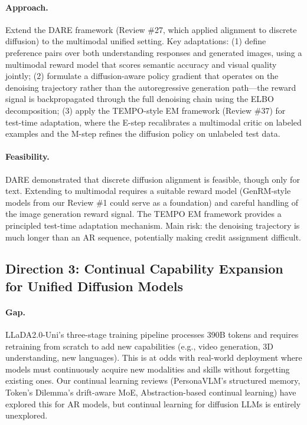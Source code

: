 \documentclass[11pt]{article}
\begin{document}
\paragraph{Approach.}
Extend the DARE framework (Review \#27, which applied alignment to discrete diffusion) to the multimodal unified setting. Key adaptations: (1) define preference pairs over both understanding responses and generated images, using a multimodal reward model that scores semantic accuracy and visual quality jointly; (2) formulate a diffusion-aware policy gradient that operates on the denoising trajectory rather than the autoregressive generation path---the reward signal is backpropagated through the full denoising chain using the ELBO decomposition; (3) apply the TEMPO-style EM framework (Review \#37) for test-time adaptation, where the E-step recalibrates a multimodal critic on labeled examples and the M-step refines the diffusion policy on unlabeled test data.

\paragraph{Feasibility.}
DARE demonstrated that discrete diffusion alignment is feasible, though only for text. Extending to multimodal requires a suitable reward model (GenRM-style models from our Review \#1 could serve as a foundation) and careful handling of the image generation reward signal. The TEMPO EM framework provides a principled test-time adaptation mechanism. Main risk: the denoising trajectory is much longer than an AR sequence, potentially making credit assignment difficult.

\subsection{Direction 3: Continual Capability Expansion for Unified Diffusion Models}

\paragraph{Gap.}
LLaDA2.0-Uni's three-stage training pipeline processes 390B tokens and requires retraining from scratch to add new capabilities (e.g., video generation, 3D understanding, new languages). This is at odds with real-world deployment where models must continuously acquire new modalities and skills without forgetting existing ones. Our continual learning reviews (PersonaVLM's structured memory, Token's Dilemma's drift-aware MoE, Abstraction-based continual learning) have explored this for AR models, but continual learning for diffusion LLMs is entirely unexplored.
\end{document}
